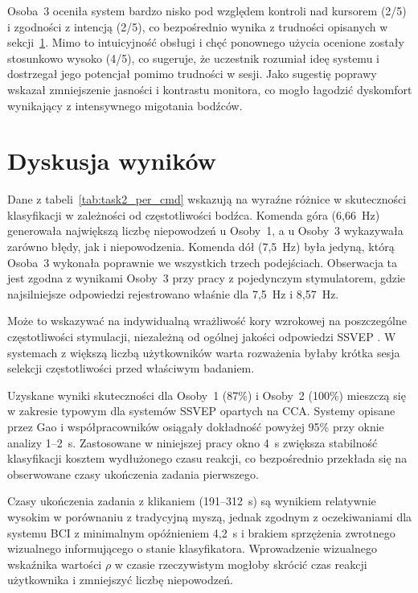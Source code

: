 Osoba~3 oceniła system bardzo nisko pod względem kontroli
nad kursorem (2/5) i zgodności z intencją (2/5),
co bezpośrednio wynika z trudności opisanych
w sekcji~\ref{sec:dyskusja}. Mimo to intuicyjność
obsługi i chęć ponownego użycia ocenione zostały
stosunkowo wysoko (4/5), co sugeruje, że uczestnik
rozumiał ideę systemu i dostrzegał jego potencjał
pomimo trudności w sesji. Jako sugestię poprawy
wskazał zmniejszenie jasności i kontrastu monitora,
co mogło łagodzić dyskomfort wynikający z intensywnego
migotania bodźców.

\section{Dyskusja wyników}
\label{sec:dyskusja}

Dane z tabeli~\ref{tab:task2_per_cmd} wskazują na wyraźne
różnice w skuteczności klasyfikacji w zależności od częstotliwości
bodźca. Komenda góra (6,66~Hz) generowała największą liczbę
niepowodzeń u Osoby~1, a u Osoby~3 wykazywała zarówno
błędy, jak i niepowodzenia. Komenda dół (7,5~Hz) była jedyną,
którą Osoba~3 wykonała poprawnie we wszystkich trzech podejściach.
Obserwacja ta jest zgodna z wynikami Osoby~3 przy pracy
z pojedynczym stymulatorem, gdzie najsilniejsze odpowiedzi
rejestrowano właśnie dla 7,5~Hz i 8,57~Hz.

Może to wskazywać na indywidualną wrażliwość kory wzrokowej
na poszczególne częstotliwości stymulacji, niezależną od
ogólnej jakości odpowiedzi SSVEP \cite{guger2012}.
W systemach z większą liczbą użytkowników warta rozważenia
byłaby krótka sesja selekcji częstotliwości przed właściwym
badaniem.


Uzyskane wyniki skuteczności dla Osoby~1 (87\%) i Osoby~2 (100\%)
mieszczą się w zakresie typowym dla systemów SSVEP opartych
na CCA. Systemy opisane przez Gao i współpracowników
\cite{gao2014} osiągały dokładność powyżej 95\% przy oknie
analizy 1--2~s. Zastosowane w niniejszej pracy okno 4~s
zwiększa stabilność klasyfikacji kosztem wydłużonego
czasu reakcji, co bezpośrednio przekłada się
na obserwowane czasy ukończenia zadania pierwszego.

Czasy ukończenia zadania z klikaniem (191--312~s) są wynikiem
relatywnie wysokim w porównaniu z tradycyjną myszą,
jednak zgodnym z oczekiwaniami dla systemu BCI
z minimalnym opóźnieniem 4,2~s i brakiem sprzężenia
zwrotnego wizualnego informującego o stanie klasyfikatora.
Wprowadzenie wizualnego wskaźnika wartości $\rho$
w czasie rzeczywistym mogłoby skrócić czas reakcji
użytkownika i zmniejszyć liczbę niepowodzeń.


